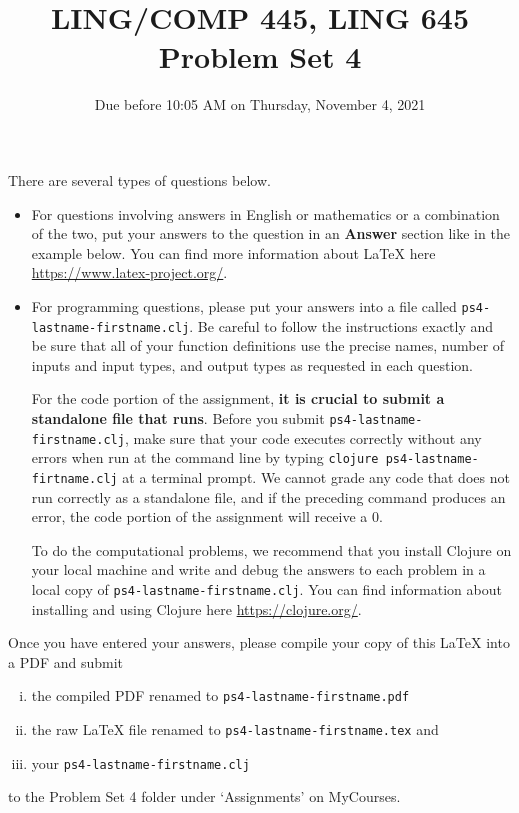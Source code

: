 \documentclass[10pt]{article}
\author{}
\newcommand{\PSnum}{4}
\begin{document}
\title{LING/COMP 445, LING 645\\Problem Set \PSnum}
\date{Due before 10:05 AM on Thursday, November 4, 2021}
\maketitle
There are several types of questions below. 
\begin{itemize}
\item
For questions involving answers in English or mathematics or a
combination of the two, put your answers to the question in an
\textbf{Answer} section like in the example below. You can find more
information about \LaTeX{} here \url{https://www.latex-project.org/}.

\item For programming questions,
please put your answers into a file called
\texttt{ps\PSnum-lastname-firstname.clj}. Be careful to follow the instructions
exactly and be sure that all of your function definitions use the
precise names, number of inputs and input types, and output types as
requested in each question.

For the code portion of the assignment, \textbf{it is crucial to submit a
standalone file that runs}. Before you submit \texttt{ps\PSnum-lastname-firstname.clj}, 
make sure that your code executes correctly without any errors 
when run at the command line by typing 
\texttt{clojure ps\PSnum-lastname-firtname.clj} at a terminal
prompt. We cannot grade any code that does not run correctly as a
standalone file, and if the preceding command produces an error,
the code portion of the assignment will receive a $0$.

To do the computational problems, we recommend that you install
Clojure on your local machine and write and debug the answers to each
problem in a local copy of \texttt{ps\PSnum-lastname-firstname.clj}. You can
find information about installing and using Clojure here
\url{https://clojure.org/}.
\end{itemize}
Once you have entered your answers, please compile your copy of this
\LaTeX{} into a PDF and submit 
\begin{enumerate}[(i),noitemsep]
\item
the compiled PDF renamed to
\texttt{ps\PSnum-lastname-firstname.pdf} 
\item
the raw \LaTeX{} file renamed to
\texttt{ps\PSnum-lastname-firstname.tex} and 
\item
your \texttt{ps\PSnum-lastname-firstname.clj}
\end{enumerate}
to the Problem Set \PSnum{} folder under `Assignments' on MyCourses.
\end{document}
